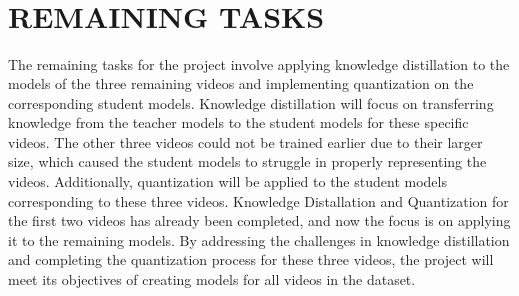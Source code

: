 \documentclass{ioereport}
\begin{document}


\coverpage


\coverpageB






\tableofcontents\
\pagebreak

\listoffigures\
\pagebreak

\listoftables\
\pagebreak

\doublespacing\
\printglossary[type=\acronymtype,style=acronyms-only,title=List of Abbreviations{\vspace{0.15\baselineskip}}]
\onehalfspacing\


\mainsection











\section{\MakeUppercase{Remaining Tasks}}
The remaining tasks for the project involve applying knowledge distillation to the models of the three remaining videos and implementing quantization on the corresponding student models. Knowledge distillation will focus on transferring knowledge from the teacher models to the student models for these specific videos. The other three videos could not be trained earlier due to their larger size, which caused the student models to struggle in properly representing the videos.
Additionally, quantization will be applied to the student models corresponding to these three videos. Knowledge Distallation and Quantization for the first two videos has already been completed, and now the focus is on applying it to the remaining models. By addressing the challenges in knowledge distillation and completing the quantization process for these three videos, the project will meet its objectives of creating models for all videos in the dataset.
\pagebreak


\end{document}

